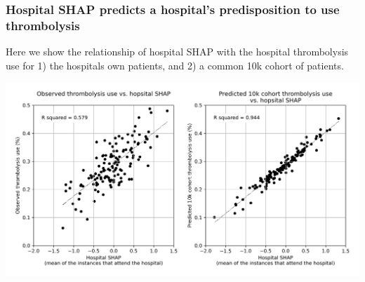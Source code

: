 \begin{frame}
\frametitle{Hospital SHAP predicts a hospital's predisposition to use thrombolysis}

\footnotesize Here we show the relationship of hospital SHAP with the hospital thrombolysis use for 1) the hospitals own patients, and 2) a common 10k cohort of patients.

\begin{center}
\includegraphics[width=1.0\textwidth]{./images/99_twin_correlation_scatter.jpg}
\end{center}
\end{frame}